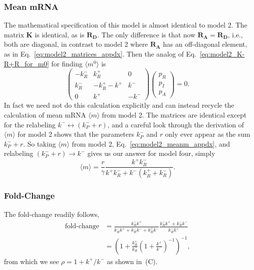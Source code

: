 \subsubsection{Mean mRNA}
The mathematical specification of this model is almost identical to model 2.
The matrix $\mathbf{K}$ is identical, as is $\mathbf{R_D}$. The only difference
is that now $\mathbf{R_A}=\mathbf{R_D}$, i.e., both are diagonal, in contrast to
model 2 where $\mathbf{R_A}$ has an off-diagonal element, as in
Eq.~\ref{eq:model2_matrices_appdx}. Then the analog of
Eq.~\ref{eq:model2_K-R+R_for_m0} for finding $\langle{m}^0\rangle$ is
\begin{equation}
\begin{pmatrix} -k_R^- & k_R^+ & 0 \\
        k_R^- & -k_R^+ -k^+ & k^-\\
        0 & k^+ & -k^-
\end{pmatrix}
\begin{pmatrix}
    p_R \\ p_I \\ p_A
\end{pmatrix}
= 0.
\end{equation}
In fact we need not do this calculation explicitly and can instead recycle the
calculation of mean mRNA $\langle{m}\rangle$ from model 2. The matrices are
identical except for the relabeling $k^- \longleftrightarrow (k_P^- + r)$, and
a careful look through the derivation of $\langle{m}\rangle$ for model 2 shows
that the parameters $k_P^-$ and $r$ only ever appear as the sum $k_P^- + r$. So
taking $\langle{m}\rangle$ from model 2, Eq.~\ref{eq:model2_meanm_appdx}, and
relabeling $(k_P^- + r) \rightarrow k^-$ gives us our answer for model four,
simply
\begin{equation}
\langle{m}\rangle = \frac{r}{\gamma}
        \frac{k^+ k_R^-} {k^+ k_R^- + k^- (k_R^+ + k_R^-)}.
\end{equation}

\subsubsection{Fold-Change}

The fold-change readily follows,
\begin{align}
\text{fold-change}
&=      \frac{k_R^- k^+}{k_R^- k^+ + k_R^- k^- + k_R^+ k^-}
        \frac{k_R^- k^+ + k_R^- k^-}{k_R^- k^+}
\\
&=      \left(1 + \frac{k_R^+}{k_R^-}
                \left(1 + \frac{k^+}{k^-}\right)^{-1}
        \right)^{-1},
\end{align}
from which we see $\rho = 1 + k^+/k^-$ as shown in~(C).

